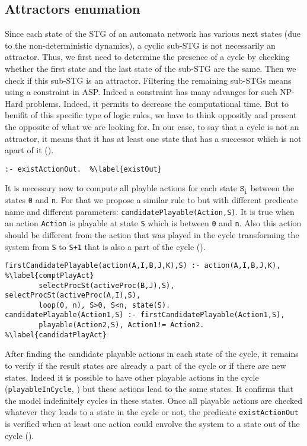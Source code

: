 \subsection{Attractors enumation}
Since each state of the STG of an automata network has various next states (due to the non-deterministic dynamics), a cyclic sub-STG is not necessarily an attractor. Thus, we first need to determine the presence of a cycle by checking whether the first state and the last state of the sub-STG are the same. Then we check if this sub-STG is an attractor. 
Filtering the remaining sub-STGs means using a constraint in ASP. Indeed a constraint has many advanges for such NP-Hard problems. Indeed, it permits to decrease the computational time. But to benifit of this specific type of logic rules, we have to think oppositly and present the opposite of what we are looking for. 
In our case, to say that a cycle is not an attractor, it means that it has at least one state that has a successor which is not apart of it ().
\begin{lstlisting}
:- existActionOut.  %\label{existOut}
\end{lstlisting}
It is necessary now to compute all playble actions for each state $\texttt{S}_\texttt{i}$ between the states \texttt{0} and \texttt{n}. For that we propose a similar rule to  but with different predicate name and different parameters: \texttt{candidatePlayable(Action,S)}. It is true when an action \texttt{Action} is playable at state \texttt{S} which is between \texttt{0} and \texttt{n}. Also this action should be different from the action that was played in the cycle transforming the system from \texttt{S} to \texttt{S+1} that is also a part of the cycle ().
\begin{lstlisting}
firstCandidatePlayable(action(A,I,B,J,K),S) :- action(A,I,B,J,K), %\label{comptPlayAct}
		selectProcSt(activeProc(B,J),S), selectProcSt(activeProc(A,I),S), 
		loop(0, n), S>0, S<n, state(S).		
candidatePlayable(Action1,S) :- firstCandidatePlayable(Action1,S), 
		playable(Action2,S), Action1!= Action2.	%\label{candidatPlayAct}
\end{lstlisting}
After finding the candidate playable actions in each state of the cycle, it remains to verify if the result states are already a part of the cycle or if there are new states. Indeed it is possible to have other playable actions in the cycle (\texttt{playableInCycle}, ) but these actions lead to the same states. It confirms that the model indefinitely cycles in these states. Once all playable actions are checked whatever they leads to a state in the cycle or not, the predicate \texttt{existActionOut} is verified when at least one action could envolve the system to a state out of the cycle ().
